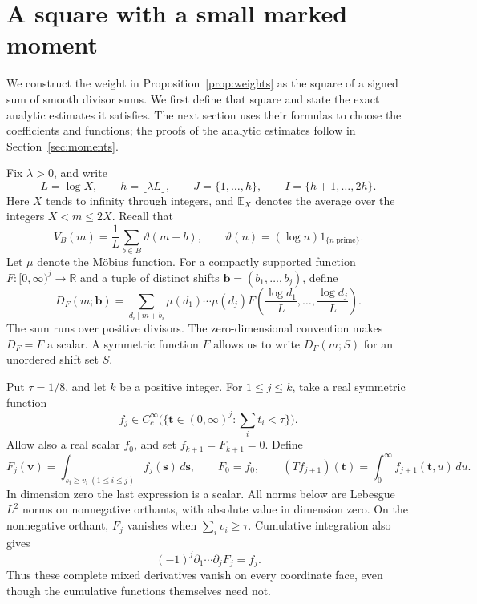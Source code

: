 \section{A square with a small marked moment}
\label{sec:weights}

We construct the weight in Proposition~\ref{prop:weights} as the square
of a signed sum of smooth divisor sums. We first define that square
and state the exact analytic estimates it satisfies. The next section
uses their formulas to choose the coefficients and functions; the
proofs of the analytic estimates follow in Section~\ref{sec:moments}.

Fix $\lambda>0$, and write
\[
 L=\log X,\qquad h=\lfloor\lambda L\rfloor,\qquad
 J=\{1,\ldots,h\},\qquad I=\{h+1,\ldots,2h\}.
\]
Here $X$ tends to infinity through integers, and $\mathbb E_X$ denotes
the average over the integers $X<m\le2X$.  Recall that
\[
 V_B(m)=\frac1L\sum_{b\in B}\vartheta(m+b),\qquad
 \vartheta(n)=(\log n)1_{\{n\ {\text{prime}}\}}.
\]
Let $\mu$ denote the M\"obius function. For a compactly supported
function $F:[0,\infty)^j\to\mathbb R$ and a tuple of distinct shifts
$\mathbf b=(b_1,\ldots,b_j)$, define
\[
 D_F(m;\mathbf b)
 =\sum_{d_i\mid m+b_i}\mu(d_1)\cdots\mu(d_j)
       F\left(\frac{\log d_1}{L},\ldots,
              \frac{\log d_j}{L}\right).
\]
The sum runs over positive divisors.
The zero-dimensional convention makes $D_F=F$ a scalar.  A symmetric
function $F$ allows us to write $D_F(m;S)$ for an unordered shift set $S$.

Put $\tau=1/8$, and let $k$ be a positive integer. For $1\le j\le k$, take a real symmetric function
\[
 f_j\in C_c^\infty
 \bigl(\{\mathbf t\in(0,\infty)^j:\textstyle\sum_i t_i<\tau\}\bigr).
\]
Allow also a real scalar $f_0$, and set $f_{k+1}=F_{k+1}=0$.  Define
\[
 F_j(\mathbf v)=\int_{s_i\ge v_i\ (1\le i\le j)}
                         f_j(\mathbf s)\,d\mathbf s,
 \qquad F_0=f_0,
 \qquad
 (Tf_{j+1})(\mathbf t)=\int_0^\infty f_{j+1}(\mathbf t,u)\,du.
\]
In dimension zero the last expression is a scalar.  All norms below
are Lebesgue $L^2$ norms on nonnegative orthants, with absolute value
in dimension zero. On the nonnegative orthant, $F_j$ vanishes when
$\sum_i v_i\ge\tau$. Cumulative integration also gives
\begin{equation}
 (-1)^j\partial_1\cdots\partial_jF_j=f_j.
 \label{eq:cumulative-derivative}
\end{equation}
Thus these complete mixed derivatives vanish on every coordinate
face, even though the cumulative functions themselves need not.

